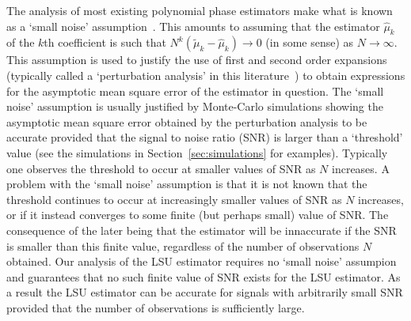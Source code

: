 \documentclass[journal]{IEEEtran}
\begin{document}
The analysis of most existing polynomial phase estimators make what is known as a `small noise' assumption~\cite{Peleg_linear_FM,Oshea_cpf_2004,Djurovic_haf_cpf_2012,Djuric_phase_unwrap_chirp_1990}.  This amounts to assuming that the estimator $\hat{\mu}_k$ of the $k$th coefficient is such that $N^{k}(\tilde{\mu}_k -  \hat{\mu}_k) \rightarrow 0$ (in some sense) as $N \rightarrow \infty$.  This assumption is used to justify the use of first and second order expansions~\cite{vonMises_diff_stats_1947,vanDerVart1971_asymptotic_stats} (typically called a `perturbation analysis' in this literature~\cite{Peleg_linear_FM,Porat_asympt_HAF_DPT_1996,Oshea_cpf_2004}) to obtain expressions for the asymptotic mean square error of the estimator in question.  The `small noise' assumption is usually justified by Monte-Carlo simulations showing the asymptotic mean square error obtained by the perturbation analysis to be accurate provided that the signal to noise ratio (SNR) is larger than a `threshold' value (see the simulations in Section~\ref{sec:simulations} for examples).  Typically one observes the threshold to occur at smaller values of SNR as $N$ increases.  A problem with the `small noise' assumption is that it is not known that the threshold continues to occur at increasingly smaller values of SNR as $N$ increases, or if it instead converges to some finite (but perhaps small) value of SNR.  The consequence of the later being that the estimator will be innaccurate if the SNR is smaller than this finite value, regardless of the number of observations $N$ obtained.  Our analysis of the LSU estimator requires no `small noise' assumpion and guarantees that no such finite value of SNR exists for the LSU estimator.  As a result the LSU estimator can be accurate for signals with arbitrarily small SNR provided that the number of observations is sufficiently large.
\end{document}
